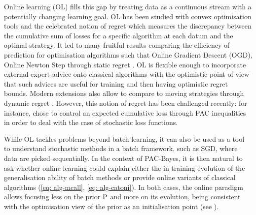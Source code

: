  Online learning (OL)  \citep{zinkevich2003online,shalev2012online,hazan2016introduction} fills this gap by treating data as a continuous stream with a potentially changing learning goal.
 OL has been studied with convex optimisation tools and the celebrated notion of regret which measures the discrepancy between the cumulative sum of losses for a specific algorithm at each datum and the optimal strategy. It led to many fruitful results comparing the  efficiency of prediction for optimisation algorithms such that Online Gradient Descent (OGD), Online Newton Step through static regret \citep{zinkevich2003online,hazan2007logarithmic}. OL is flexible enough to incorporate external expert advice onto classical algorithms with the optimistic point of view that such advices are useful for training \citep{rakhlin2013online,rakhlin2013practical} and then having optimistic regret bounds.
 Modern extensions also allow to compare to moving strategies through dynamic regret \citep[see e.g.][]{yang2016tracking,zhang2018strong,zhao2020dyn}. However, this notion of regret has been challenged recently: for instance, \citet{wintenberger2021stochastic} chose to control an expected cumulative loss through PAC inequalities in order to deal with the case of stochastic loss functions.

While OL tackles problems beyond batch learning, it can also be used as a tool to understand stochastic methods in a batch framework, such as SGD, where data are picked sequentially. In the context of PAC-Bayes, it is then natural to ask whether online learning could explain either the in-training evolution of the generalisation ability of batch methods or provide online variants of classical algorithms (\eg \eqref{eq: alg-mcall}, \eqref{eq: alg-catoni}). In both cases, the online paradigm allows focusing less on the prior $\P$ and more on its evolution, being consistent with the optimisation view of the prior as an initialisation point (see ). 

